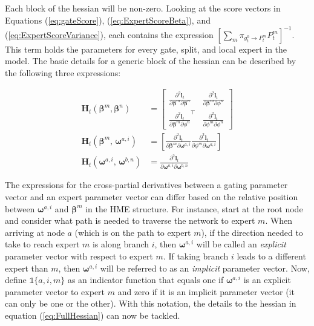 \documentclass[12pt]{article}
\newcommand{\bw}[1]{\boldsymbol{\omega}^{#1}}
\newcommand{\Ht}[1]{\mathbf{H}_{t}(#1)}
\newcommand{\gateprod}[2]{\pi_{#1 \longrightarrow #2}}
\theoremstyle{definition}
\begin{document}
Each block of the hessian will be non-zero. Looking at the score vectors in Equations (\ref{eq:gateScore}), (\ref{eq:ExpertScoreBeta}), and (\ref{eq:ExpertScoreVariance}), each contains the expression $\left[ \sum_{m} \gateprod{g^{0}_{t}}{P^{m}_{t}} P^{m}_{t} \right]^{-1}$. This term holds the parameters for every gate, split, and local expert in the model. The basic details for a generic block of the hessian can be described by the following three expressions:

\begin{align}
  \Ht{\boldsymbol{\beta}^{m}, \boldsymbol{\beta}^{n}} &= \begin{bmatrix} \label{eq:expertNodeHessian}
    \frac{\partial^{2} \boldsymbol{l}_{t}}{\partial \boldsymbol{\beta}^{m} \partial \boldsymbol{\beta}^{n}}    &  \frac{\partial^{2} \boldsymbol{l}_{t}}{\partial \boldsymbol{\beta}^{m} \partial \phi^{n}}     \\
    \frac{\partial^{2} \boldsymbol{l}_{t}}{\partial \boldsymbol{\beta}^{m} \partial \phi^{n}}^{\top}           &  \frac{\partial^{2} \boldsymbol{l}_{t}}{\partial \phi^{m} \partial \phi^{n}}
    \end{bmatrix} \\
    \Ht{\boldsymbol{\beta}^{m}, \, \bw{a, i}} &= \left[ \frac{\partial^{2} \boldsymbol{l}_{t}}{\partial \boldsymbol{\beta}^{m} \partial \bw{a, i}}  \frac{\partial^{2} \boldsymbol{l}_{t}}{ \partial \phi^{m} \partial \bw{a, i} }  \right] \\
    \Ht{\bw{a, i}, \, \bw{b, n}} &= \frac{\partial^{2} \boldsymbol{l}_{t}}{\partial \boldsymbol{\omega}^{a, i} \partial \boldsymbol{\omega}^{b,n}}
\end{align}

\bigskip

The expressions for the cross-partial derivatives between a gating parameter vector and an expert parameter vector can differ based on the relative position between $\bw{a, i}$ and $\boldsymbol{\beta}^{m}$ in the HME structure. For instance, start at the root node and consider what path is needed to traverse the network to expert $m$. When arriving at node $a$ (which is on the path to expert $m$), if the direction needed to take to reach expert $m$ is along branch $i$, then $\bw{a,i}$ will be called an \textit{explicit} parameter vector with respect to expert $m$. If taking branch $i$ leads to a different expert than $m$, then $\bw{a,i}$ will be referred to as an \textit{implicit} parameter vector. Now, define $\mathbb{1}\{a, i, m\}$ as an indicator function that equals one if $\bw{a, i}$ is an explicit parameter vector to expert $m$ and zero if it is an implicit parameter vector (it can only be one or the other). With this notation, the details to the hessian in equation (\ref{eq:FullHessian}) can now be tackled.
\end{document}

